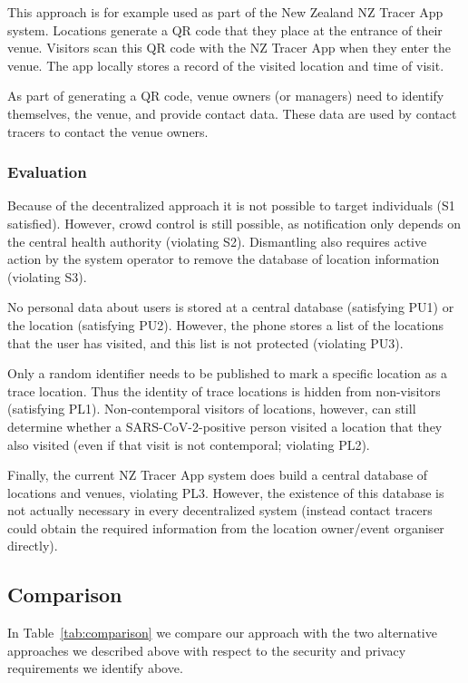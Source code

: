 This approach is for example used as part of the New Zealand NZ Tracer App system. Locations generate a QR code that they place at the entrance of their venue. Visitors scan this QR code with the NZ Tracer App when they enter the venue. The app locally stores a record of the visited location and time of visit.

As part of generating a QR code, venue owners (or managers) need to identify themselves, the venue, and provide contact data. These data are used by contact tracers to contact the venue owners.

\subsubsection{Evaluation}
Because of the decentralized approach it is not possible to target individuals (S1 satisfied). However, crowd control is still possible, as notification only depends on the central health authority (violating S2). Dismantling also requires active action by the system operator to remove the database of location information (violating S3).

No personal data about users is stored at a central database (satisfying PU1) or the location (satisfying PU2). However, the phone stores a list of the locations that the user has visited, and this list is not protected (violating PU3).

Only a random identifier needs to be published to mark a specific location as a trace location. Thus the identity of trace locations is hidden from non-visitors (satisfying PL1). Non-contemporal visitors of locations, however, can still determine whether a SARS-CoV-2-positive person visited a location that they also visited (even if that visit is not contemporal; violating PL2).

Finally, the current NZ Tracer App system does build a central database of locations and venues, violating PL3. However, the existence of this database is not actually necessary in every decentralized system (instead contact tracers could obtain the required information from the location owner/event organiser directly).

\subsection{Comparison}
In Table~\ref{tab:comparison} we compare our approach with the two alternative approaches we described above with respect to the security and privacy requirements we identify above.

